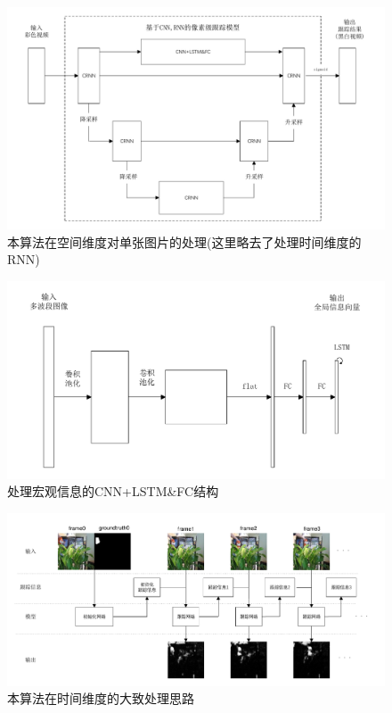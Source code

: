 \par
\begin{figure}[htbp!]
    \centering
    \includegraphics[width = 1.\textwidth]{chap/img/space_process.pdf}
    \caption{本算法在空间维度对单张图片的处理(这里略去了处理时间维度的RNN)}
    \label{fig:space_process}
\end{figure}
\par
\begin{figure}[htbp!]
    \centering
    \includegraphics[width = 1.\textwidth]{chap/img/CNN_FCLSTM.pdf}
    \caption{处理宏观信息的CNN+LSTM\&FC结构}
    \label{fig:CNN_FCLSTM}
\end{figure}
\par
\begin{figure}[htbp!]
    \centering
    \includegraphics[width = 1.\textwidth]{chap/img/time_process.pdf}
    \caption{本算法在时间维度的大致处理思路}
    \label{fig:time_process}
\end{figure}

